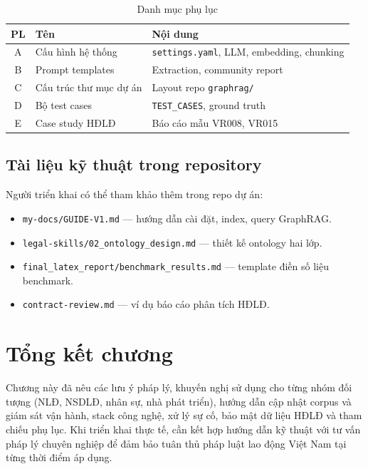 \documentclass[../DoAn.tex]{subfiles}
\begin{document}
\begin{table}[H]
\centering
\caption{Danh mục phụ lục}
\label{table:appendices}
\begin{tabular}{|c|l|p{7cm}|}
\hline
\textbf{PL} & \textbf{Tên} & \textbf{Nội dung} \\
\hline
A & Cấu hình hệ thống & \texttt{settings.yaml}, LLM, embedding, chunking \\
B & Prompt templates & Extraction, community report \\
C & Cấu trúc thư mục dự án & Layout repo \texttt{graphrag/} \\
D & Bộ test cases & \texttt{TEST\_CASES}, ground truth \\
E & Case study HĐLĐ & Báo cáo mẫu VR008, VR015 \\
\hline
\end{tabular}
\end{table}

\subsection{Tài liệu kỹ thuật trong repository}
\label{subsection:7.5.3}

Người triển khai có thể tham khảo thêm trong repo dự án:
\begin{itemize}[nosep, leftmargin=*]
    \item \texttt{my-docs/GUIDE-V1.md} --- hướng dẫn cài đặt, index, query GraphRAG.
    \item \texttt{legal-skills/02\_ontology\_design.md} --- thiết kế ontology hai lớp.
    \item \texttt{final\_latex\_report/benchmark\_results.md} --- template điền số liệu benchmark.
    \item \texttt{contract-review.md} --- ví dụ báo cáo phân tích HĐLĐ.
\end{itemize}

\section{Tổng kết chương}
\label{section:7.6}

Chương này đã nêu các lưu ý pháp lý, khuyến nghị sử dụng cho từng nhóm đối tượng (NLĐ, NSDLĐ, nhân sự, nhà phát triển), hướng dẫn cập nhật corpus và giám sát vận hành, stack công nghệ, xử lý sự cố, bảo mật dữ liệu HĐLĐ và tham chiếu phụ lục. Khi triển khai thực tế, cần kết hợp hướng dẫn kỹ thuật với tư vấn pháp lý chuyên nghiệp để đảm bảo tuân thủ pháp luật lao động Việt Nam tại từng thời điểm áp dụng.
\end{document}
